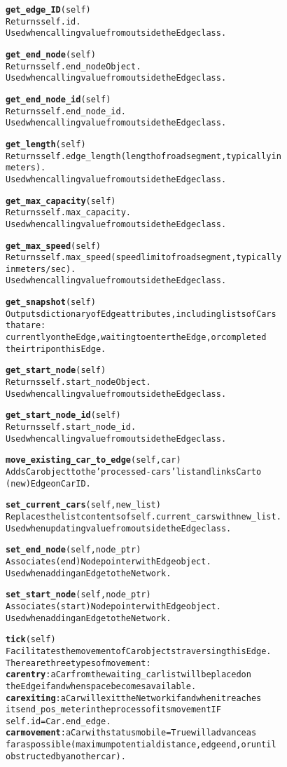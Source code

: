\begin{alltt}
\textbf{get_edge_ID}(self)
Returns self.id.
Used when calling value from outside the Edge class.

\textbf{get_end_node}(self)
Returns self.end_node Object.
Used when calling value from outside the Edge class.

\textbf{get_end_node_id}(self)
Returns self.end_node_id.
Used when calling value from outside the Edge class.

\textbf{get_length}(self)
Returns self.edge_length (length of road segment, typically in 
meters).
Used when calling value from outside the Edge class.

\textbf{get_max_capacity}(self)
Returns self.max_capacity.
Used when calling value from outside the Edge class.

\textbf{get_max_speed}(self)
Returns self.max_speed (speed limit of road segment, typically
in meters/sec).
Used when calling value from outside the Edge class.

\textbf{get_snapshot}(self)
Outputs dictionary of Edge attributes, including lists of Cars 
that are:
currently on the Edge, waiting to enter the Edge, or completed 
their trip on this Edge.

\textbf{get_start_node}(self)
Returns self.start_node Object.
Used when calling value from outside the Edge class.

\textbf{get_start_node_id}(self)
Returns self.start_node_id.
Used when calling value from outside the Edge class.

\textbf{move_existing_car_to_edge}(self, car)
Adds Car object to the 'processed-cars' list and links Car to 
(new) Edge on Car ID.

\textbf{set_current_cars}(self, new_list)
Replaces the list contents of self.current_cars with new_list.
Used when updating value from outside the Edge class.

\textbf{set_end_node}(self, node_ptr)
Associates (end) Node pointer with Edge object.
Used when adding an Edge to the Network.

\textbf{set_start_node}(self, node_ptr)
Associates (start) Node pointer with Edge object.
Used when adding an Edge to the Network.

\textbf{tick}(self)
Facilitates the movement of Car objects traversing this Edge.  
There are three types of movement:
\textbf{car entry}:  a Car from the waiting_car list will be placed on 
the Edge if and when space becomes available.
\textbf{car exiting}:  a Car will exit the Network if and when it reaches
its end_pos_meter in the process of its movement IF 
self.id = Car.end_edge.
\textbf{car movement}:  a Car with status mobile = True will advance as
far as possible (maximum potential distance, edge end, or until 
obstructed by another car).



\end{alltt}



